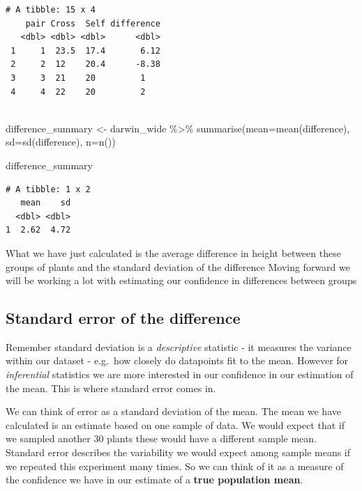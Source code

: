 \documentclass[
]{book}
\makeatletter
\newenvironment{Shaded}{\begin{snugshade}}{\end{snugshade}}
\newcommand{\AttributeTok}[1]{\textcolor[rgb]{0.77,0.63,0.00}{#1}}
\newcommand{\FunctionTok}[1]{\textcolor[rgb]{0.00,0.00,0.00}{#1}}
\newcommand{\NormalTok}[1]{#1}
\newcommand{\OtherTok}[1]{\textcolor[rgb]{0.56,0.35,0.01}{#1}}
\newcommand{\SpecialCharTok}[1]{\textcolor[rgb]{0.00,0.00,0.00}{#1}}
\newenvironment{kframe}{%
\medskip{}
\setlength{\fboxsep}{.8em}
 \def\at@end@of@kframe{}%
 \ifinner\ifhmode%
  \def\at@end@of@kframe{\end{minipage}}%
  \begin{minipage}{\columnwidth}%
 \fi\fi%
 \def\FrameCommand##1{\hskip\@totalleftmargin \hskip-\fboxsep
 \colorbox{shadecolor}{##1}\hskip-\fboxsep
     \hskip-\linewidth \hskip-\@totalleftmargin \hskip\columnwidth}%
 \MakeFramed {\advance\hsize-\width
   \@totalleftmargin\z@ \linewidth\hsize
   \@setminipage}}%
 {\par\unskip\endMakeFramed%
 \at@end@of@kframe}
\newenvironment{block}[1]
  {
  \begin{itemize}
  \renewcommand{\labelitemi}{
    \raisebox{-.7\height}[0pt][0pt]{
      {\setkeys{Gin}{width=3em,keepaspectratio}\texttt{[image: images/\#1]}}
    }
  }
  \setlength{\fboxsep}{1em}
  \begin{kframe}
  \item
  }
  {
  \end{kframe}
  \end{itemize}
  }
\newenvironment{rmdwarning}
  {\begin{block}{warning}}
  {\end{block}}
\makeatother
\begin{document}
\begin{verbatim}
# A tibble: 15 x 4
    pair Cross  Self difference
   <dbl> <dbl> <dbl>      <dbl>
 1     1  23.5  17.4       6.12
 2     2  12    20.4      -8.38
 3     3  21    20         1   
 4     4  22    20         2   
 
\end{verbatim}

\begin{Shaded}
\begin{Highlighting}[]
\NormalTok{difference\_summary }\OtherTok{\textless{}{-}}\NormalTok{ darwin\_wide }\SpecialCharTok{\%\textgreater{}\%} 
  \FunctionTok{summarise}\NormalTok{(}\AttributeTok{mean=}\FunctionTok{mean}\NormalTok{(difference),}
            \AttributeTok{sd=}\FunctionTok{sd}\NormalTok{(difference),}
            \AttributeTok{n=}\FunctionTok{n}\NormalTok{())}

\NormalTok{difference\_summary}
\end{Highlighting}
\end{Shaded}

\begin{verbatim}
# A tibble: 1 x 2
   mean    sd
  <dbl> <dbl>
1  2.62  4.72
\end{verbatim}

\begin{rmdwarning}
What we have just calculated is the average difference in height between
these groups of plants and the standard deviation of the difference
Moving forward we will be working a lot with estimating our confidence
in differences between groups
\end{rmdwarning}

\hypertarget{standard-error-of-the-difference}{%
\subsection{Standard error of the difference}\label{standard-error-of-the-difference}}

Remember standard deviation is a \emph{descriptive} statistic - it measures the variance within our dataset - e.g.~how closely do datapoints fit to the mean. However for \emph{inferential} statistics we are more interested in our confidence in our estimation of the mean. This is where standard error comes in.

We can think of error as a standard deviation of the mean. The mean we have calculated is an estimate based on one sample of data. We would expect that if we sampled another 30 plants these would have a different sample mean. Standard error describes the variability we would expect among sample means if we repeated this experiment many times. So we can think of it as a measure of the confidence we have in our estimate of a \textbf{true population mean}.
\end{document}
